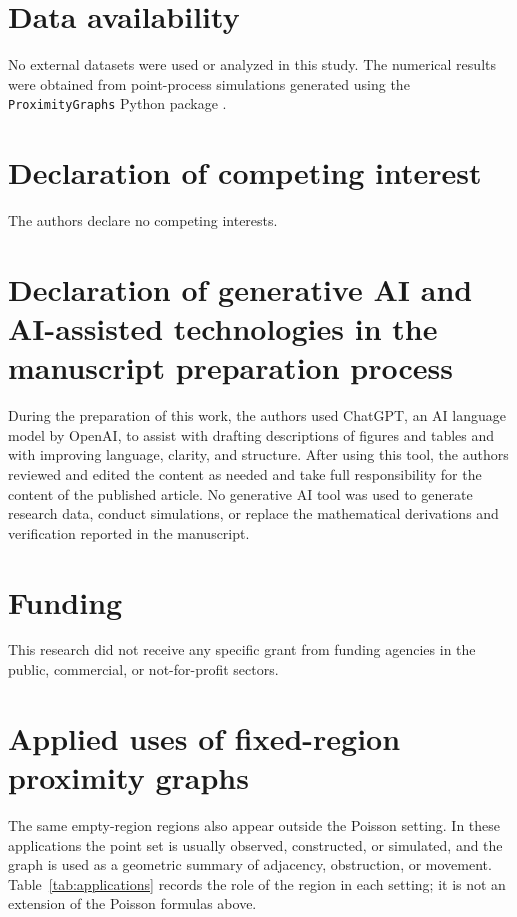 \documentclass[a4paper,fleqn]{cas-dc}
\numberwithin{equation}{section}
\newcommand{\1}{\mathds{1}}
\newcommand{\0}{\mathbf{0}}
\begin{document}
\section*{Data availability}

No external datasets were used or analyzed in this study. The numerical
results were obtained from point-process simulations generated
using the \texttt{ProximityGraphs} Python package \citep{proximitygraphs}.

\section*{Declaration of competing interest}
The authors declare no competing interests.

\section*{Declaration of generative AI and AI-assisted technologies in the manuscript preparation process}
During the preparation of this work, the authors used ChatGPT, an AI language model by OpenAI, to assist with drafting descriptions of figures and tables and with improving language, clarity, and structure. After using this tool, the authors reviewed and edited the content as needed and take full responsibility for the content of the published article. No generative AI tool was used to generate research data, conduct simulations, or replace the mathematical derivations and verification reported in the manuscript.

\section*{Funding}
This research did not receive any specific grant from funding agencies in the public, commercial, or not-for-profit sectors.


\printcredits





\clearpage
\onecolumn
\appendix

\section{Applied uses of fixed-region proximity graphs}

The same empty-region regions also appear outside the Poisson setting.  In
these applications the point set is usually observed, constructed, or simulated,
and the graph is used as a geometric summary of adjacency, obstruction, or
movement.  Table~\ref{tab:applications} records the role of the region in each setting; it is
not an extension of the Poisson formulas above.
\end{document}
